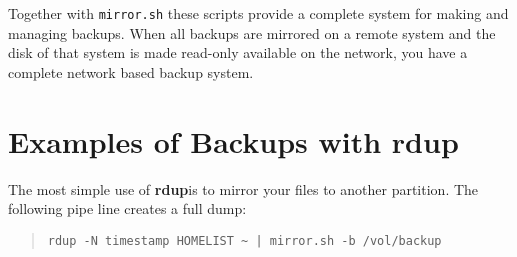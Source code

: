 \documentclass{article}
\newcommand{\rdup}{\textbf{rdup}}
\newcommand{\cmd}[1]{\texttt{#1}}
\begin{document}
Together with \cmd{mirror.sh} these scripts provide a complete system
for making and managing backups. When all backups are mirrored on a
remote system and the disk of that system is made read-only available on 
the network, you have a complete network based backup system. 

\section*{Examples of Backups with rdup}
The most simple use of \rdup is to mirror your files to
another partition. The following pipe line creates a
full dump:
\begin{quote}
\begin{verbatim}
rdup -N timestamp HOMELIST ~ | mirror.sh -b /vol/backup
\end{verbatim}
\end{quote}
\end{document}
